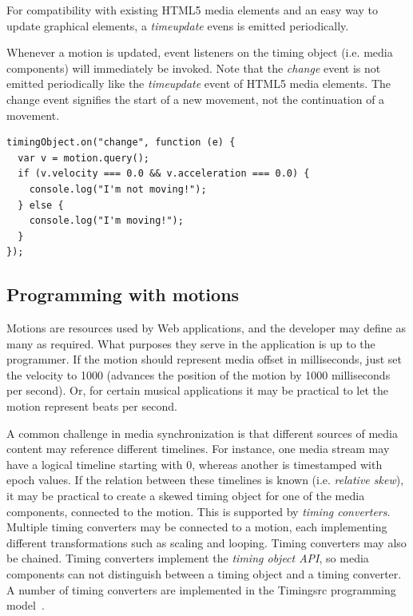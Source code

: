 \documentclass[graybox]{svmult}
\begin{document}
For compatibility with existing HTML5 media elements and an easy way to update graphical elements, a \emph{timeupdate} evens is emitted periodically.


Whenever a motion is updated, event listeners on the timing object (i.e. media components)
will immediately be invoked. Note that the \emph{change} event is not emitted
periodically like the \emph{timeupdate} event of HTML5 media elements. The change event signifies the start of a
new movement, not the continuation of a movement.



\begin{lstlisting}[caption=Monitoring changes to the motion through the change event.]
timingObject.on("change", function (e) {
  var v = motion.query();
  if (v.velocity === 0.0 && v.acceleration === 0.0) {
    console.log("I'm not moving!");
  } else {
    console.log("I'm moving!");
  }
});
\end{lstlisting}




\subsection{Programming with motions}



Motions are resources used by Web applications, and the developer may define
as many as required. What purposes they serve in the application is up to the
programmer. If the motion should represent media offset in milliseconds, just
set the velocity to 1000 (advances the position of the motion by 1000
milliseconds per second). Or, for certain musical applications it may be
practical to let the motion represent beats per second.


A common challenge in media synchronization is that different sources of media
content may reference different timelines. For instance, one media stream may
have a logical timeline starting with 0, whereas another is timestamped with
epoch values. If the relation between these timelines is known (i.e.
\emph{relative skew}), it may be practical to create a skewed timing object
for one of the media components, connected to the motion. This is supported by
\emph{timing converters}. Multiple timing converters may be connected to a
motion, each implementing different transformations such as scaling and
looping. Timing converters may also be chained. Timing converters implement
the \emph{timing object API}, so media components can not distinguish between
a timing object and a timing converter. A number of timing converters are
implemented in the Timingsrc programming model~\cite{timingsrc}.
\end{document}
